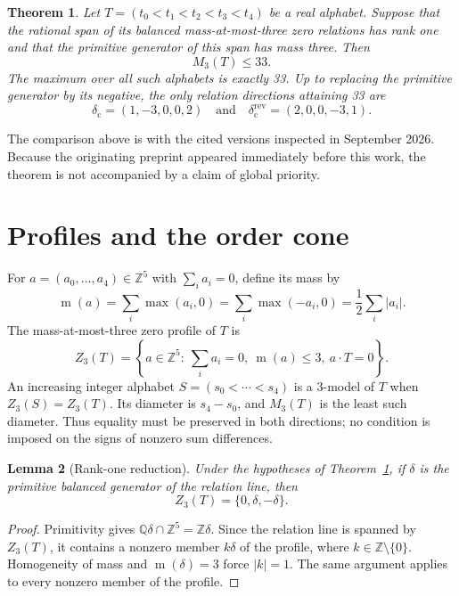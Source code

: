 \documentclass[11pt]{article}
\newtheorem{theorem}{Theorem}
\newtheorem{lemma}[theorem]{Lemma}
\theoremstyle{definition}
\newcommand{\Z}{\mathbb Z}
\newcommand{\Q}{\mathbb Q}
\newcommand{\mass}{\operatorname{m}}
\begin{document}
\begin{theorem}\label{thm:main}
Let $T=(t_0<t_1<t_2<t_3<t_4)$ be a real alphabet.  Suppose that the rational
span of its balanced mass-at-most-three zero relations has rank one and that
the primitive generator of this span has mass three.  Then
\[
                         M_3(T)\leq 33.
\]
The maximum over all such alphabets is exactly 33.  Up to replacing the
primitive generator by its negative, the only relation directions attaining
33 are
\[
  \delta_{\mathrm c}=(1,-3,0,0,2)
  \quad\text{and}\quad
  \delta_{\mathrm c}^{\mathrm{rev}}=(2,0,0,-3,1).
\]
\end{theorem}

The comparison above is with the cited versions inspected in September
2026.  Because the originating preprint appeared immediately before this
work, the theorem is not accompanied by a claim of global priority.

\section{Profiles and the order cone}

For $a=(a_0,\ldots,a_4)\in\Z^5$ with $\sum_i a_i=0$, define its mass by
\[
 \mass(a)=\sum_i\max(a_i,0)
          =\sum_i\max(-a_i,0)=\frac12\sum_i|a_i|.
\]
The mass-at-most-three zero profile of $T$ is
\[
 Z_3(T)=\left\{a\in\Z^5:\ \sum_i a_i=0,\ \mass(a)\leq3,
                         \ a\cdot T=0\right\}.
\]
An increasing integer alphabet $S=(s_0<\cdots<s_4)$ is a $3$-model of $T$
when $Z_3(S)=Z_3(T)$.  Its diameter is $s_4-s_0$, and $M_3(T)$ is the least
such diameter.  Thus equality must be preserved in both directions; no
condition is imposed on the signs of nonzero sum differences.

\begin{lemma}[Rank-one reduction]\label{lem:profile}
Under the hypotheses of Theorem~\ref{thm:main}, if $\delta$ is the primitive
balanced generator of the relation line, then
\[
                         Z_3(T)=\{0,\delta,-\delta\}.
\]
\end{lemma}

\begin{proof}
Primitivity gives $\Q\delta\cap\Z^5=\Z\delta$.  Since the relation line is
spanned by $Z_3(T)$, it contains a nonzero member $k\delta$ of the profile,
where $k\in\Z\setminus\{0\}$.  Homogeneity of mass and
$\mass(\delta)=3$ force $|k|=1$.  The same argument applies to every nonzero
member of the profile.
\end{proof}
\end{document}
